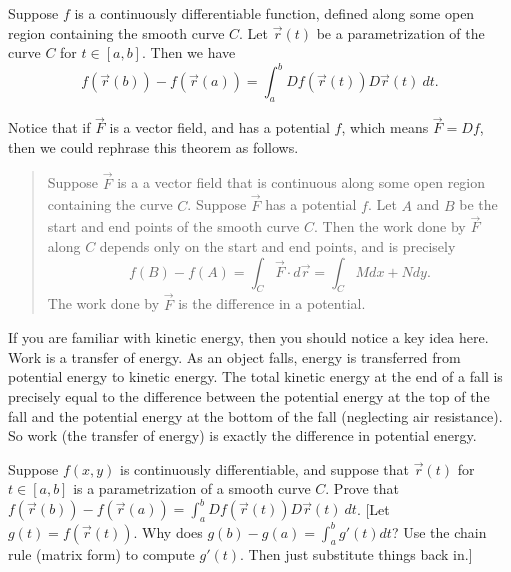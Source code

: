 \begin{theorem}
%
 Suppose $f$ is a continuously differentiable function, defined along some open region containing the smooth curve $C$. Let $\vec r(t)$ be a parametrization of the curve $C$ for $t\in[a,b]$. Then we have
$$f(\vec r(b))-f(\vec r(a))=\int_a^b Df(\vec r(t))D\vec r(t)\ dt.$$
\end{theorem}
Notice that if $\vec F$ is a vector field, and has a potential $f$, which means $\vec F = Df$, then we could rephrase this theorem as follows. 
\begin{quote}
 Suppose $\vec F$ is a a vector field that is continuous along some open region containing the curve $C$. Suppose $\vec F$ has a potential $f$. Let $A$ and $B$ be the start and end points of the smooth curve $C$.  Then the work done by $\vec F$ along $C$ depends only on the start and end points, and is precisely
$$f(B)-f(A)=\int_C \vec F\cdot d\vec r = \int_C Mdx+Ndy.$$
 The work done by $\vec F$ is the difference in a potential.
\end{quote}
If you are familiar with kinetic energy, then you should notice a key idea here.  Work is a transfer of energy. As an object falls, energy is transferred from potential energy to kinetic energy.  The total kinetic energy at the end of a fall is precisely equal to the difference between the potential energy at the top of the fall and the potential energy at the bottom of the fall (neglecting air resistance). So work (the transfer of energy) is exactly the difference in potential energy.  

\begin{problem}
 Suppose $f(x,y)$ is continuously differentiable, and suppose that $\vec r(t)$ for $t\in[a,b]$ is a parametrization of a smooth curve $C$. Prove that $f(\vec r(b))-f(\vec r(a)) = \int_a^b Df(\vec r(t))D\vec r(t)\ dt$. [Let $g(t) = f(\vec r(t))$. Why does $g(b)-g(a) = \int_a^b g'(t)dt$? Use the chain rule (matrix form) to compute $g'(t)$. Then just substitute things back in.]  
\end{problem}

